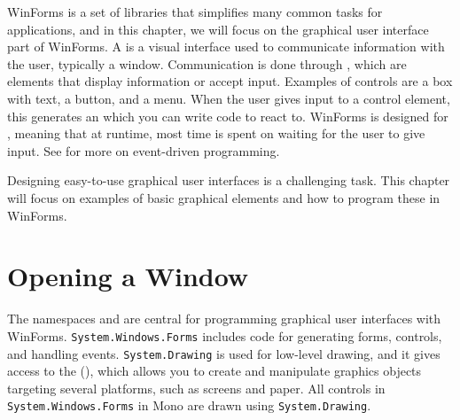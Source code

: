 \documentclass[fsharpnotes.tex]{subfiles}
\begin{document}
WinForms is a set of libraries that simplifies many common tasks for applications, and in this chapter, we will focus on the graphical user interface part of WinForms. A  is a visual interface used to communicate information with the user, typically a window. Communication is done through , which are elements that display information or accept input. Examples of controls are a box with text, a button, and a menu. When the user gives input to a control element, this generates an  which you can write code to react to. WinForms is designed for , meaning that at runtime, most time is spent on waiting for the user to give input. See  for more on event-driven programming.

Designing easy-to-use graphical user interfaces is a challenging task. This chapter will focus on examples of basic graphical elements and how to program these in WinForms.

\section{Opening a Window}
The namespaces  and  are central for programming graphical user interfaces with WinForms. \lstinline{System.Windows.Forms} includes code for generating forms, controls, and handling events. \lstinline{System.Drawing} is used for low-level drawing, and it gives access to the  (), which allows you to create and manipulate graphics objects targeting several platforms, such as screens and paper. All controls in \lstinline{System.Windows.Forms} in Mono are drawn using \lstinline{System.Drawing}. 
\end{document}
